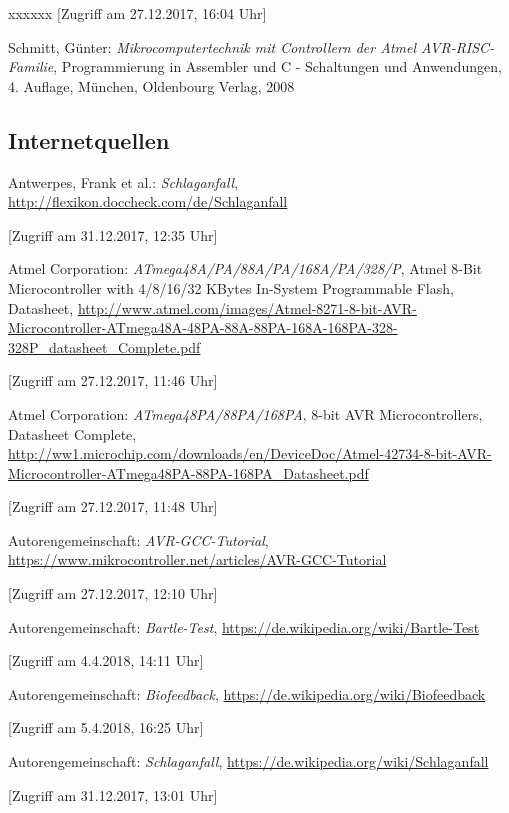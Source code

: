 \begin{thebibliography}{xxxxxx}
[Zugriff am 27.12.2017, 16:04 Uhr]

 Schmitt, Günter: \textit{Mikrocomputertechnik mit Controllern der Atmel AVR-RISC-Familie}, Programmierung in Assembler und C - Schaltungen und Anwendungen, 4. Auflage, München, Oldenbourg Verlag, 2008

\subsection*{Internetquellen}

 Antwerpes, Frank et al.: \textit{Schlaganfall}, \url{http://flexikon.doccheck.com/de/Schlaganfall}

[Zugriff am 31.12.2017, 12:35 Uhr]

 Atmel Corporation: \textit{ATmega48A/PA/88A/PA/168A/PA/328/P}, Atmel 8-Bit Microcontroller with 4/8/16/32 KBytes In-System Programmable Flash, Datasheet, \url{http://www.atmel.com/images/Atmel-8271-8-bit-AVR-Microcontroller-ATmega48A-48PA-88A-88PA-168A-168PA-328-328P_datasheet_Complete.pdf} 

[Zugriff am 27.12.2017, 11:46 Uhr]

 Atmel Corporation: \textit{ATmega48PA/88PA/168PA}, 8-bit AVR Microcontrollers, Datasheet Complete, \url{http://ww1.microchip.com/downloads/en/DeviceDoc/Atmel-42734-8-bit-AVR-Microcontroller-ATmega48PA-88PA-168PA_Datasheet.pdf} 

[Zugriff am 27.12.2017, 11:48 Uhr]

 Autorengemeinschaft: \textit{AVR-GCC-Tutorial}, \url{https://www.mikrocontroller.net/articles/AVR-GCC-Tutorial}

[Zugriff am 27.12.2017, 12:10 Uhr]

 Autorengemeinschaft: \textit{Bartle-Test}, \url{https://de.wikipedia.org/wiki/Bartle-Test}

[Zugriff am 4.4.2018, 14:11 Uhr]

 Autorengemeinschaft: \textit{Biofeedback}, \url{https://de.wikipedia.org/wiki/Biofeedback}

[Zugriff am 5.4.2018, 16:25 Uhr]

 Autorengemeinschaft: \textit{Schlaganfall}, \url{https://de.wikipedia.org/wiki/Schlaganfall}

[Zugriff am 31.12.2017, 13:01 Uhr]


\end{thebibliography}
